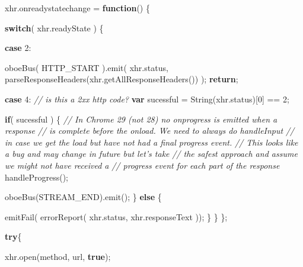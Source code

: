 \documentclass[12pt, ]{article}
\newenvironment{Shaded}{}{}
\newcommand{\KeywordTok}[1]{\textcolor[rgb]{0.00,0.44,0.13}{\textbf{{#1}}}}
\newcommand{\DecValTok}[1]{\textcolor[rgb]{0.25,0.63,0.44}{{#1}}}
\newcommand{\CommentTok}[1]{\textcolor[rgb]{0.38,0.63,0.69}{\textit{{#1}}}}
\newcommand{\OtherTok}[1]{\textcolor[rgb]{0.00,0.44,0.13}{{#1}}}
\newcommand{\FunctionTok}[1]{\textcolor[rgb]{0.02,0.16,0.49}{{#1}}}
\newcommand{\NormalTok}[1]{{#1}}
\begin{document}
\begin{Shaded}
\begin{Highlighting}[]
   \OtherTok{xhr}\NormalTok{.}\FunctionTok{onreadystatechange} \NormalTok{= }\KeywordTok{function}\NormalTok{() \{}
      
      \KeywordTok{switch}\NormalTok{( }\OtherTok{xhr}\NormalTok{.}\FunctionTok{readyState} \NormalTok{) \{}
               
         \KeywordTok{case} \DecValTok{2}\NormalTok{:       }
         
            \FunctionTok{oboeBus}\NormalTok{( HTTP_START ).}\FunctionTok{emit}\NormalTok{( }
               \OtherTok{xhr}\NormalTok{.}\FunctionTok{status}\NormalTok{,}
               \FunctionTok{parseResponseHeaders}\NormalTok{(}\OtherTok{xhr}\NormalTok{.}\FunctionTok{getAllResponseHeaders}\NormalTok{()) );}
            \KeywordTok{return}\NormalTok{;}
            
         \KeywordTok{case} \DecValTok{4}\NormalTok{:       }
            \CommentTok{// is this a 2xx http code?}
            \KeywordTok{var} \NormalTok{sucessful = }\FunctionTok{String}\NormalTok{(}\OtherTok{xhr}\NormalTok{.}\FunctionTok{status}\NormalTok{)[}\DecValTok{0}\NormalTok{] == }\DecValTok{2}\NormalTok{;}
            
            \KeywordTok{if}\NormalTok{( sucessful ) \{}
               \CommentTok{// In Chrome 29 (not 28) no onprogress is emitted when a response}
               \CommentTok{// is complete before the onload. We need to always do handleInput}
               \CommentTok{// in case we get the load but have not had a final progress event.}
               \CommentTok{// This looks like a bug and may change in future but let's take}
               \CommentTok{// the safest approach and assume we might not have received a }
               \CommentTok{// progress event for each part of the response}
               \FunctionTok{handleProgress}\NormalTok{();}
               
               \FunctionTok{oboeBus}\NormalTok{(STREAM_END).}\FunctionTok{emit}\NormalTok{();}
            \NormalTok{\} }\KeywordTok{else} \NormalTok{\{}

               \FunctionTok{emitFail}\NormalTok{( }\FunctionTok{errorReport}\NormalTok{(}
                  \OtherTok{xhr}\NormalTok{.}\FunctionTok{status}\NormalTok{, }
                  \OtherTok{xhr}\NormalTok{.}\FunctionTok{responseText}
               \NormalTok{));}
            \NormalTok{\}}
      \NormalTok{\}}
   \NormalTok{\};}

   \KeywordTok{try}\NormalTok{\{}
   
      \OtherTok{xhr}\NormalTok{.}\FunctionTok{open}\NormalTok{(method, url, }\KeywordTok{true}\NormalTok{);}
   

\end{Highlighting}
\end{Shaded}
\end{document}
